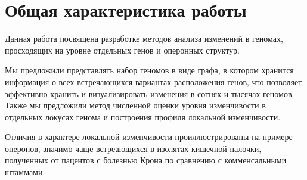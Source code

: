 \section*{Общая характеристика работы}
Данная работа посвящена разработке методов анализа изменений в геномах, просходящих на уровне отдельных генов и оперонных структур.

Мы предложили представлять набор геномов в виде графа, в котором хранится информация о всех встречающихся вариантах расположения генов, что позволяет эффективно хранить и визуализировать изменения в сотнях и тысячах геномов. Также мы предложили метод численной оценки уровня изменчивости в отдельных локусах генома и построения профиля локальной изменчивости. 

Отличия в характере локальной изменчивости проиллюстрированы на примере оперонов, значимо чаще встреающихся в изолятах кишечной палочки, полученных от пацентов с болезнью Крона по сравнению с комменсальными штаммами.
\newcommand{\actuality}{\pdfbookmark[1]{Актуальность}{actuality}\underline{\textbf{\actualityTXT}}}
\newcommand{\progress}{\pdfbookmark[1]{Разработанность темы}{progress}\underline{\textbf{\progressTXT}}}
\newcommand{\aim}{\pdfbookmark[1]{Цели}{aim}\underline{{\textbf\aimTXT}}}
\newcommand{\tasks}{\pdfbookmark[1]{Задачи}{tasks}\underline{\textbf{\tasksTXT}}}
\newcommand{\aimtasks}{\pdfbookmark[1]{Цели и задачи}{aimtasks}\aimtasksTXT}
\newcommand{\novelty}{\pdfbookmark[1]{Научная новизна}{novelty}\underline{\textbf{\noveltyTXT}}}
\newcommand{\influence}{\pdfbookmark[1]{Практическая значимость}{influence}\underline{\textbf{\influenceTXT}}}
\newcommand{\methods}{\pdfbookmark[1]{Методология и методы исследования}{methods}\underline{\textbf{\methodsTXT}}}
\newcommand{\defpositions}{\pdfbookmark[1]{Положения, выносимые на защиту}{defpositions}\underline{\textbf{\defpositionsTXT}}}
\newcommand{\reliability}{\pdfbookmark[1]{Достоверность}{reliability}\underline{\textbf{\reliabilityTXT}}}
\newcommand{\probation}{\pdfbookmark[1]{Апробация}{probation}\underline{\textbf{\probationTXT}}}
\newcommand{\contribution}{\pdfbookmark[1]{Личный вклад}{contribution}\underline{\textbf{\contributionTXT}}}
\newcommand{\publications}{\pdfbookmark[1]{Публикации}{publications}\underline{\textbf{\publicationsTXT}}}


